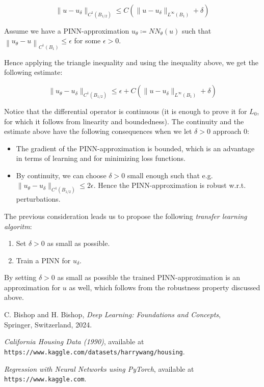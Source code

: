 \documentclass[letterpaper,12pt]{article}
\begin{document}
\begin{equation*}
\|u-u_{\delta}\|_{C^{1}\left(B_{1 / 2}\right)} \leq C\left(\|u-u_{\delta}\|_{L^{\infty}\left(B_{1}\right)}+\delta\right)
\end{equation*}

Assume we have a PINN-approximation $u_{\theta}\coloneqq N\!N_{\theta}(u)$ such that
$\left\|u_{\theta}-u\right\|_{C^{1}\left(B_{1}\right)} \leq \epsilon$ for some $\epsilon>0$.

Hence applying the triangle inequality and using the inequality above, we get the following estimate:

\begin{equation*}
\|u_{\theta}-u_{\delta}\|_{C^{1}\left(B_{1 / 2}\right)} \leq\epsilon + C\left(\|u-u_{\delta}\|_{L^{\infty}\left(B_{1}\right)}+\delta\right)
\end{equation*} 

Notice that the differential operator is continuous (it is enough to prove it for $L_0$, for which it follows from linearity and boundedness). The continuity and the estimate above have the following consequences when we let $\delta>0$ approach $0$:
\begin{itemize}
  	\item The gradient of the PINN-approximation is bounded, which is an advantage in terms of learning and for minimizing loss functions.
	\item  By continuity, we can choose $\delta>0$ small enough such that e.g. 
		$\|u_{\theta}-u_{\delta}\|_{C^{1}\left(B_{1 / 2}\right)} \leq 2\epsilon.$ Hence the PINN-approximation is robust w.r.t. perturbations.
\end{itemize}

The previous consideration leads us to propose the following \textit{transfer learning algoritm}:
\begin{enumerate}
	\setlength\itemsep{-0.2em}
	\item	Set $\delta>0$ as small as possible.
  	\item	Train a PINN for $u_{\delta}$.
\end{enumerate}

By setting  $\delta>0$ as small as possible the trained PINN-approximation is an approximation for $u$ as well, which follows from the robustness property discussed above.


\begin{thebibliography}{99}

C. Bishop and H. Bishop, \textit{Deep Learning: Foundations and Concepts},\\
Springer, Switzerland, 2024.

 \emph{California Housing Data (1990)},  available at\\
\texttt{https://www.kaggle.com/datasets/harrywang/housing}.

 \emph{Regression with Neural Networks using PyTorch},  available at\\
\texttt{https://www.kaggle.com}.


\end{thebibliography}
\end{document}
